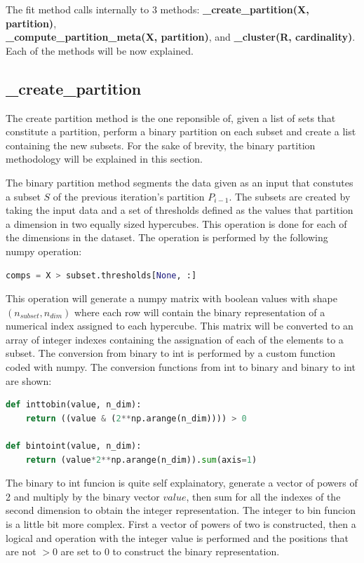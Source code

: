 The fit method calls internally to 3 methods: \textbf{\_create\_partition(X, partition)}, \\ \textbf{\_compute\_partition\_meta(X, partition)}, and \textbf{\_cluster(R, cardinality)}. Each of the methods will be now explained.

\subsection{\_create\_partition}
The create partition method is the one reponsible of, given a list of sets that constitute a partition, perform a binary partition on each subset and create a list containing the new subsets. For the sake of brevity, the binary partition methodology will be explained in this section.

The binary partition method segments the data given as an input that constutes a subset $S$ of the previous iteration's partition $P_{i-1}$. The subsets are created by taking the input data and a set of thresholds defined as the values that partition a dimension in two equally sized hypercubes. This operation is done for each of the dimensions in the dataset. The operation is performed by the following numpy operation: 

\begin{lstlisting}[language=python]
comps = X > subset.thresholds[None, :]
\end{lstlisting}

This operation will generate a numpy matrix with boolean values with shape $(n_{subset}, n_{dim})$ where each row will contain the binary representation of a numerical index assigned to each hypercube. This matrix will be converted to an array of integer indexes containing the assignation of each of the elements to a subset. The conversion from binary to int is performed by a custom function coded with numpy. The conversion functions from int to binary and binary to int are shown: 

\begin{lstlisting}[language=python]
def inttobin(value, n_dim):
    return ((value & (2**np.arange(n_dim)))) > 0

def bintoint(value, n_dim):
    return (value*2**np.arange(n_dim)).sum(axis=1)
\end{lstlisting}

The binary to int funcion is quite self explainatory, generate a vector of powers of 2 and multiply by the binary vector $value$, then sum for all the indexes of the second dimension to obtain the integer representation. The integer to bin funcion is a little bit more complex. First a vector of powers of two is constructed, then a logical and operation with the integer value is performed and the positions that are not $> 0$ are set to 0 to construct the binary representation.

